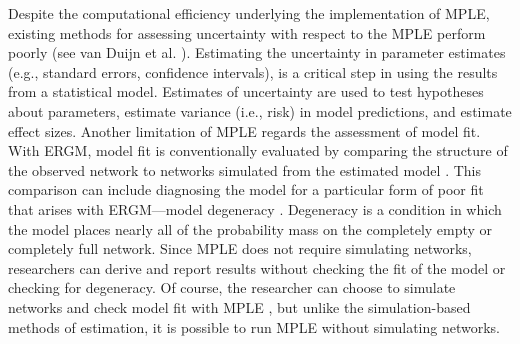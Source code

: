 \documentclass[10pt, conference, compsocconf]{IEEEtran}
\begin{document}
Despite the computational efficiency underlying the implementation of MPLE,  existing methods for assessing uncertainty with respect to the MPLE perform poorly (see van Duijn et al. \cite{vanDuijnetal2009}). Estimating the uncertainty in parameter estimates (e.g., standard errors, confidence intervals), is a critical step in using the results from a statistical model. Estimates of uncertainty are used to test hypotheses about parameters, estimate variance (i.e., risk) in model predictions, and estimate effect sizes. Another limitation of MPLE regards the assessment of model fit. With ERGM, model fit is conventionally evaluated by comparing the structure of the observed network to networks simulated from the estimated model \cite{Hunter.2008}. This comparison can include diagnosing the model for a particular form of poor fit that arises with ERGM---model degeneracy \cite{schweinberger2011instability}. Degeneracy is a condition in which the model places nearly all of the probability mass on the completely empty or completely full network. Since MPLE does not require simulating networks, researchers can derive and report results without checking the fit of the model or checking for degeneracy. Of course, the researcher can choose to simulate networks and check model fit with MPLE , but unlike the simulation-based methods of estimation, it is possible to run MPLE without simulating networks.
\end{document}
